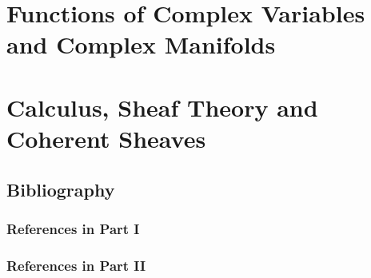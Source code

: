 \documentclass[11pt,oneside,openany]{book}
\begin{document}
\frontmatter
\hypersetup{pageanchor=false}

\hypersetup{pageanchor=true}


\begingroup
    \setlength{\parskip}{0pt}
    \tableofcontents
    \clearpage
\endgroup

\mainmatter
\part{Functions of Complex Variables and Complex Manifolds}






\part{Calculus, Sheaf Theory and Coherent Sheaves}





\backmatter
\chapter*{Bibliography}
\section*{References in Part I}

\section*{References in Part II}



\cleardoublepage
{}
{}

\printindex
\end{document}
